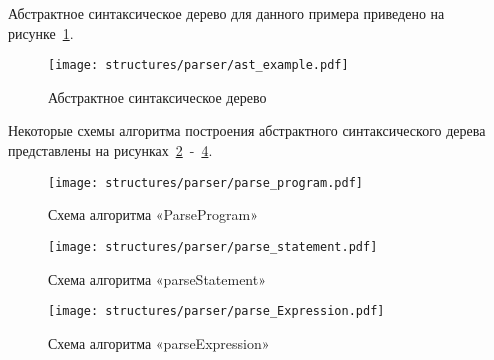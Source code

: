 Абстрактное синтаксическое дерево для данного примера приведено на рисунке~\ref{f:ast_example}.

\begin{figure}[ht]
	\centering
	\vspace{\toppaddingoffigure}
	\texttt{[image: structures/parser/ast\_example.pdf]}
	\caption{Абстрактное синтаксическое дерево}
	\label{f:ast_example}
\end{figure}

Некоторые схемы алгоритма построения абстрактного синтаксического дерева представлены на рисунках~\ref{f:parse_program}~-~\ref{f:parse_Expression}.


\clearpage

\begin{figure}[!htp]
	\centering
	\texttt{[image: structures/parser/parse\_program.pdf]}
	\caption{Схема алгоритма «ParseProgram»}
	\label{f:parse_program}
\end{figure}

\clearpage

\begin{figure}[!htp]
	\centering
	\texttt{[image: structures/parser/parse\_statement.pdf]}
	\caption{Схема алгоритма «parseStatement»}
	\label{f:parse_statement}
\end{figure}

\clearpage

\begin{figure}[!htp]
	\centering
	\texttt{[image: structures/parser/parse\_Expression.pdf]}
	\caption{Схема алгоритма «parseExpression»}
	\label{f:parse_Expression}
\end{figure}

\clearpage

